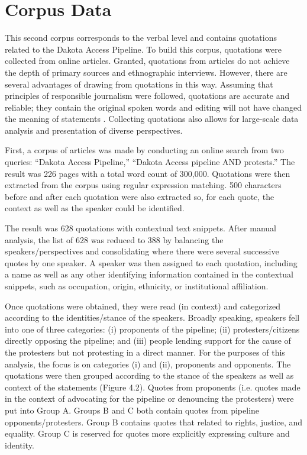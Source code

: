 \section{Corpus Data}

This second corpus corresponds to the verbal level and contains quotations related to the Dakota Access Pipeline. To build this corpus, quotations were collected from online articles. Granted, quotations from articles do not achieve the depth of primary sources and ethnographic interviews. However, there are several advantages of drawing from quotations in this way. Assuming that principles of responsible journalism were followed, quotations are accurate and reliable; they contain the original spoken words and editing will not have changed the meaning of statements \citep{CAJ2011a}. Collecting quotations also allows for large-scale data analysis and presentation of diverse perspectives.	

First, a corpus of articles was made by conducting an online search from two queries: ``Dakota Access Pipeline,'' ``Dakota Access pipeline AND protests.'' The result was 226 pages with a total word count of 300,000. Quotations were then extracted from the corpus using regular expression matching. 500 characters before and after each quotation were also extracted so, for each quote, the context as well as the speaker could be identified. 

The result was 628 quotations with contextual text snippets. After manual analysis, the list of 628 was reduced to 388 by balancing the speakers/perspectives and consolidating where there were several successive quotes by one speaker. A speaker was then assigned to each quotation, including a name as well as any other identifying information contained in the contextual snippets, such as occupation, origin, ethnicity, or institutional affiliation.

Once quotations were obtained, they were read (in context) and categorized according to the identities/stance of the speakers. Broadly speaking, speakers fell into one of three categories: (i) proponents of the pipeline; (ii) protesters/citizens directly opposing the pipeline; and (iii) people lending support for the cause of the protesters but not protesting in a direct manner. For the purposes of this analysis, the focus is on categories (i) and (ii), proponents and opponents. The quotations were then grouped according to the stance of the speakers as well as context of the statements (Figure 4.2). Quotes from proponents (i.e. quotes made in the context of advocating for the pipeline or denouncing the protesters) were put into Group A. Groups B and C both contain quotes from pipeline opponents/protesters. Group B contains quotes that related to rights, justice, and equality. Group C is reserved for quotes more explicitly expressing culture and identity.  

